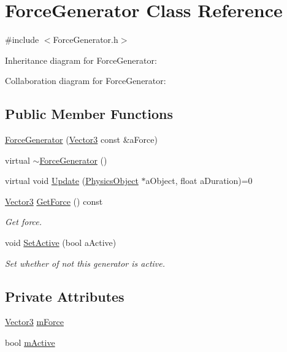 \hypertarget{classForceGenerator}{}\section{Force\+Generator Class Reference}
\label{classForceGenerator}


{\ttfamily \#include $<$Force\+Generator.\+h$>$}



Inheritance diagram for Force\+Generator\+:


Collaboration diagram for Force\+Generator\+:
\subsection*{Public Member Functions}
\begin{DoxyCompactItemize}
\item 
\hyperlink{classForceGenerator_ac683944191a985d6032bf4f2c73c809f}{Force\+Generator} (\hyperlink{structVector3}{Vector3} const \&a\+Force)
\item 
virtual \hyperlink{classForceGenerator_a8bcdb8b6f176e8d292b45524119cf77e}{$\sim$\+Force\+Generator} ()
\item 
virtual void \hyperlink{classForceGenerator_a7a5187e0514efee10d248cdb741fdb01}{Update} (\hyperlink{classPhysicsObject}{Physics\+Object} $\ast$a\+Object, float a\+Duration)=0
\item 
\hyperlink{structVector3}{Vector3} \hyperlink{classForceGenerator_a19ea7c53449a930a94d67bd0fe677cdd}{Get\+Force} () const 
\begin{DoxyCompactList}\small\item\em Get force. \end{DoxyCompactList}\item 
void \hyperlink{classForceGenerator_a1083f1a2a161487c2ed748e8c10e2123}{Set\+Active} (bool a\+Active)
\begin{DoxyCompactList}\small\item\em Set whether of not this generator is active. \end{DoxyCompactList}\end{DoxyCompactItemize}
\subsection*{Private Attributes}
\begin{DoxyCompactItemize}
\item 
\hyperlink{structVector3}{Vector3} \hyperlink{classForceGenerator_ad9aa4f065b885c07b4e3fc3ee4a5b5a3}{m\+Force}
\item 
bool \hyperlink{classForceGenerator_ac4f487f43bf862af793ebda2477fe85f}{m\+Active}
\end{DoxyCompactItemize}


